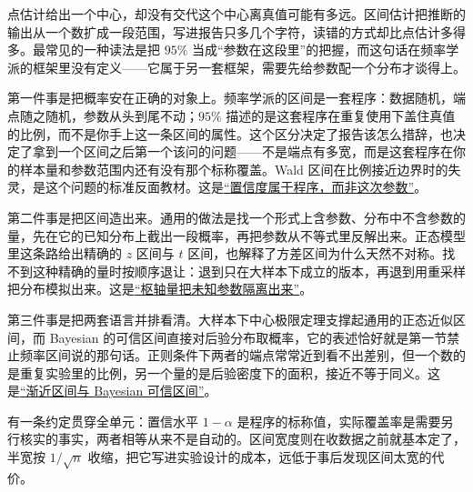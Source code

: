 点估计给出一个中心，却没有交代这个中心离真值可能有多远。区间估计把推断的输出从一个数扩成一段范围，写进报告只多几个字符，读错的方式却比点估计多得多。最常见的一种读法是把 \(95\%\) 当成``参数在这段里''的把握，而这句话在频率学派的框架里没有定义——它属于另一套框架，需要先给参数配一个分布才谈得上。

第一件事是把概率安在正确的对象上。频率学派的区间是一套程序：数据随机，端点随之随机，参数从头到尾不动；\(95\%\) 描述的是这套程序在重复使用下盖住真值的比例，而不是你手上这一条区间的属性。这个区分决定了报告该怎么措辞，也决定了拿到一个区间之后第一个该问的问题——不是端点有多宽，而是这套程序在你的样本量和参数范围内还有没有那个标称覆盖。Wald 区间在比例接近边界时的失灵，是这个问题的标准反面教材。这是\hyperref[sec:11-Mathematical-Statistics/04-Interval-Estimation/01]{``置信度属于程序，而非这次参数''}。

第二件事是把区间造出来。通用的做法是找一个形式上含参数、分布中不含参数的量，先在它的已知分布上截出一段概率，再把参数从不等式里反解出来。正态模型里这条路给出精确的 \(z\) 区间与 \(t\) 区间，也解释了方差区间为什么天然不对称。找不到这种精确的量时按顺序退让：退到只在大样本下成立的版本，再退到用重采样把分布模拟出来。这是\hyperref[sec:11-Mathematical-Statistics/04-Interval-Estimation/02]{``枢轴量把未知参数隔离出来''}。

第三件事是把两套语言并排看清。大样本下中心极限定理支撑起通用的正态近似区间，而 Bayesian 的可信区间直接对后验分布取概率，它的表述恰好就是第一节禁止频率区间说的那句话。正则条件下两者的端点常常近到看不出差别，但一个数的是重复实验里的比例，另一个量的是后验密度下的面积，接近不等于同义。这是\hyperref[sec:11-Mathematical-Statistics/04-Interval-Estimation/03]{``渐近区间与 Bayesian 可信区间''}。

有一条约定贯穿全单元：置信水平 \(1-\alpha\) 是程序的标称值，实际覆盖率是需要另行核实的事实，两者相等从来不是自动的。区间宽度则在收数据之前就基本定了，半宽按 \(1/\sqrt n\) 收缩，把它写进实验设计的成本，远低于事后发现区间太宽的代价。
